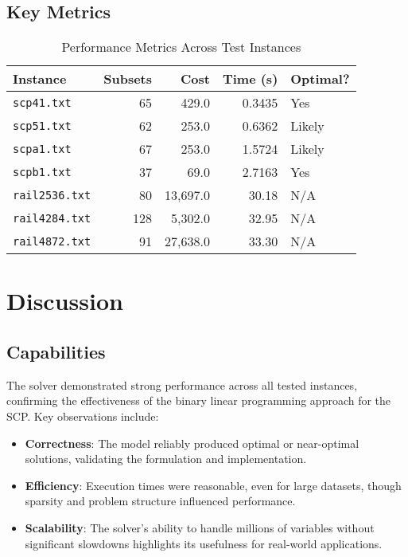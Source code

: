 \documentclass[11pt,letterpaper]{article}
\begin{document}
\subsection*{Key Metrics}
\begin{table}[!ht]
\centering
\caption{Performance Metrics Across Test Instances}
\label{table1}
\begin{tabular}{lrrrl}
\toprule
Instance & Subsets & Cost & Time (s) & Optimal? \\
\midrule
\texttt{scp41.txt} & 65 & 429.0 & 0.3435 & Yes \cite{beasley1987} \\
\texttt{scp51.txt} & 62 & 253.0 & 0.6362 & Likely \\
\texttt{scpa1.txt} & 67 & 253.0 & 1.5724 & Likely \\
\texttt{scpb1.txt} & 37 & 69.0 & 2.7163 & Yes \cite{beasley1987} \\
\texttt{rail2536.txt} & 80 & 13,697.0 & 30.18 & N/A \\
\texttt{rail4284.txt} & 128 & 5,302.0 & 32.95 & N/A \\
\texttt{rail4872.txt} & 91 & 27,638.0 & 33.30 & N/A \\
\bottomrule
\end{tabular}
\end{table}

\section*{Discussion}

\subsection*{Capabilities}
The solver demonstrated strong performance across all tested instances, confirming the effectiveness of the binary linear programming approach for the SCP. Key observations include:
\begin{itemize}
    \item \textbf{Correctness}: The model reliably produced optimal or near-optimal solutions, validating the formulation and implementation.
    \item \textbf{Efficiency}: Execution times were reasonable, even for large datasets, though sparsity and problem structure influenced performance.
    \item \textbf{Scalability}: The solver's ability to handle millions of variables without significant slowdowns highlights its usefulness for real-world applications.
\end{itemize}
\end{document}
